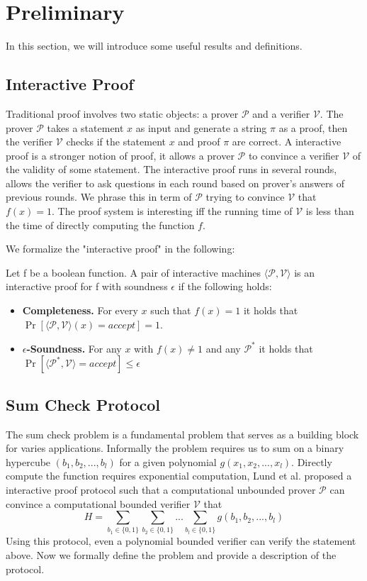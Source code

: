 \section{Preliminary}
In this section, we will introduce some useful results and definitions.
\subsection{Interactive Proof}
Traditional proof involves two static objects: a prover $\mathcal{P}$ and a verifier $\mathcal{V}$. The prover $\mathcal{P}$ takes a statement $x$ as input and generate a string $\pi$ as a proof, then the verifier $\mathcal{V}$ checks if the statement $x$ and proof $\pi$ are correct. A interactive proof is a stronger notion of proof, it allows a prover $\mathcal{P}$ to convince a verifier $\mathcal{V}$ of the validity of some statement. The interactive proof runs in several rounds, allows the verifier to ask questions in each round based on prover's answers of previous rounds. We phrase this in term of $\mathcal{P}$ trying to convince $\mathcal{V}$ that $f(x)=1$. The proof system is interesting iff the running time of $\mathcal{V}$ is less than the time of directly computing the function $f$.

We formalize the "interactive proof" in the following:	
\begin{definition}
Let f be a boolean function. A pair of interactive machines $\langle\mathcal{P}, \mathcal{V}\rangle$ is an interactive proof for f with soundness $\epsilon$ if the following holds:
\begin{itemize}
	\item {\bf Completeness.} For every $x$ such that $f(x) = 1$ it holds that $\Pr[\langle\mathcal{P}, \mathcal{V}\rangle(x)=accept]=1$.
	\item {\bf $\epsilon$-Soundness.} For any $x$ with $f(x) \neq 1$ and any $\mathcal{P}^*$ it holds that $\Pr[\langle\mathcal{P^*},\mathcal{V}\rangle=accept] \le \epsilon$
\end{itemize}
\end{definition}

\subsection{Sum Check Protocol}
The sum check problem is a fundamental problem that serves as a building block for varies applications. Informally the problem requires us to sum on a binary hypercube $(b_1, b_2, ..., b_{l})$ for a given polynomial $g(x_1, x_2, ..., x_{l})$. Directly compute the function requires exponential computation, Lund et al.\cite{sumcheck} proposed a interactive proof protocol such that a computational unbounded prover $\mathcal{P}$ can convince a computational bounded verifier $\mathcal{V}$ that $$H=\sum_{b_1\in\{0,1\}}\sum_{b_2\in\{0,1\}}...\sum_{b_{l}\in\{0,1\}}g(b_1,b_2,...,b_{l})$$
Using this protocol, even a polynomial bounded verifier can verify the statement above. Now we formally define the problem and provide a description of the protocol.

